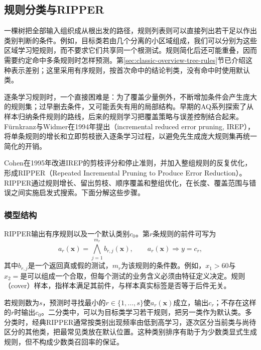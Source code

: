 \subsection{规则分类与RIPPER}
\label{sec:classification-rules}
\label{sec:classification-ripper}

一棵树把全部输入组织成从根出发的路径，规则列表则可以直接列出若干足以作出类别判断的条件。例如，目标类若由几个分离的小区域组成，我们可以分别为这些区域学习短规则，而不要求它们共享同一个根测试。规则简化后还可能重叠，因而需要约定命中多条规则时怎样预测。第\ref{sec:classic-overview-tree-rules}节已介绍这种表示差别；这里采用有序规则，按首次命中的结论判类，没有命中时使用默认类。

逐条学习规则时，一个直接困难是：为了覆盖少量例外，不断增加条件会产生庞大的规则集；过早删去条件，又可能丢失有用的局部结构。早期的AQ系列探索了从样本归纳条件规则的路线，后来的规则学习把覆盖策略与误差控制结合起来。Fürnkranz与Widmer在1994年提出（incremental reduced error pruning, IREP），将单条规则的增长和立即剪枝嵌入逐条学习过程，以避免先生成庞大规则集再统一简化的开销。

Cohen在1995年改进IREP的剪枝评分和停止准则，并加入整组规则的反复优化，形成RIPPER（Repeated Incremental Pruning to Produce Error Reduction）。RIPPER通过规则增长、留出剪枝、顺序覆盖和整组优化，在长度、覆盖范围与错误之间实施启发式搜索。下面分解这些步骤。

\subsubsection{模型结构}
\label{sec:classification-ripper-structure}

RIPPER输出有序规则以及一个默认类别$c_0$。第$r$条规则的前件可写为
\begin{equation}
  a_r(\bm{x})=\bigwedge_{j=1}^{m_r}b_{r,j}(\bm{x}),
  \qquad a_r(\bm{x})\Longrightarrow y=c_r,
  \label{eq:classification-rule-form}
\end{equation}
其中$b_{r,j}$是一个返回真或假的测试，$m_r$为该规则的条件数。例如，$x_1>60$与$x_2=\text{是}$可以组成一个合取，但每个测试的业务含义必须由特征定义决定。规则（cover）样本，指样本满足其前件，与样本真实标签是否等于后件无关。

若规则数为$s$，预测时寻找最小的$r\in\{1,\ldots,s\}$使$a_r(\bm{x})$成立，输出$c_r$；不存在这样的$r$时输出$c_0$。二分类中，可以为目标类学习若干规则，把另一类作为默认类。多分类时，经典RIPPER通常按类别出现频率由低到高学习，逐次区分当前类与尚待区分的其他类，把最常见类放在默认位置。这种类别排序有助于为少数类显式生成规则，但不构成少数类召回率的保证。


